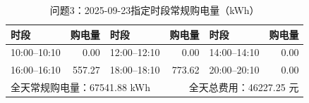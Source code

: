 \begin{table}[H]\centering\small
\caption{问题3：2025-09-23指定时段常规购电量（kWh）}
\label{tab:q3_0923_purchase}
\begin{tabular}{lrlrlr}\toprule
时段 & 购电量 & 时段 & 购电量 & 时段 & 购电量 \\\midrule
10:00--10:10 & 0.00 & 12:00--12:10 & 0.00 & 14:00--14:10 & 0.00 \\
16:00--16:10 & 557.27 & 18:00--18:10 & 773.62 & 20:00--20:10 & 0.00 \\
\midrule
\multicolumn{3}{l}{全天常规购电量：67541.88 kWh} & \multicolumn{3}{r}{全天总费用：46227.25 元}\\
\bottomrule\end{tabular}\end{table}
